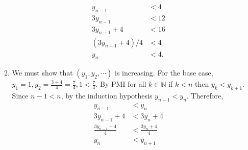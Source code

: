 \documentclass[12pt, letterpaper]{article}
\newcommand{\N}{\mathbb{N}}
\begin{document}
\begin{enumerate}
\begin{enumerate}
		\begin{align*}
			y_{n-1} &< 4\\
			3 y_{n-1} &< 12\\ 
			3 y_{n-1} + 4 &< 16\\ 
			(3 y_{n-1} + 4)/4 &< 4\\ 
			y_n &< 4.
		\end{align*}
		\item We must show that $(y_1,y_2,\cdots)$ is increasing.  For the base case, $y_1 = 1, y_2 = \frac{3 + 4}{4} = \frac{7}{4}, 1 < \frac{7}{4}$.  By PMI for all $k \in \N $ if $k < n$ then $y_k < y_{k+1}$.  Since $n-1 < n$, by the induction hypothesis $y_{n-1} < y_{n}$.  Therefore, 
		\begin{align*}
		y_{n-1} &< y_{n}\\	
		3 y_{n-1} + 4 &< 3 y_{n} + 4\\
		\frac{3 y_{n-1} + 4}{4} &< \frac{3 y_{n} + 4}{4}\\
		y_n &< y_{n+1}	
\end{align*}			
	\end{enumerate}		
\end{enumerate}
\end{document}
